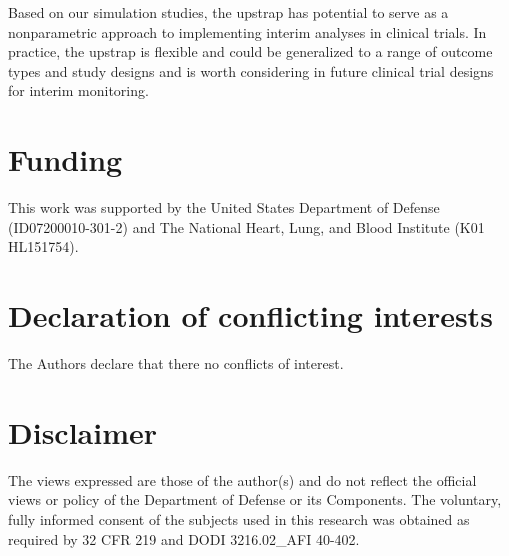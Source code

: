 \documentclass[Afour,sageh,times,square,numbers]{sagej}
\begin{document}
Based on our simulation studies, the upstrap has potential to serve as a nonparametric approach to implementing interim analyses in clinical trials. In practice, the upstrap is flexible and could be generalized to a range of outcome types and study designs and is worth considering in future clinical trial designs for interim monitoring.


\section{Funding}
This work was supported by the United States Department of Defense (ID07200010-301-2) and The National Heart, Lung, and Blood Institute (K01 HL151754).

\section{Declaration of conflicting interests}
The Authors declare that there no conflicts of interest.

\section{Disclaimer}
The views expressed are those of the author(s) and do not reflect the official views or policy of the Department of Defense or its Components. The voluntary, fully informed consent of the subjects used in this research was obtained as required by 32 CFR 219 and DODI 3216.02\_AFI 40-402.

\end{document}
